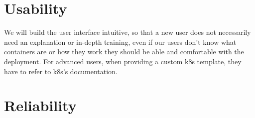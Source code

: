 \documentclass[a4paper,12pt,chapterprefix=false,bibliography=totoc,listof=totoc,]{scrreprt}
\begin{document}
\section{Usability}
We will build the user interface intuitive, so that a new user does not necessarily need an explanation or in-depth training, even if our users don't know what containers are or how they work they should be able and comfortable with the deployment. For advanced users, when providing a custom \gls{k8s} template, they have to refer to \gls{k8s}'s documentation.


\section{Reliability}
\end{document}

